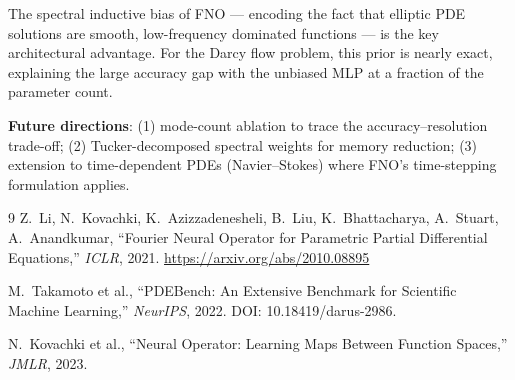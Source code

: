 \documentclass[11pt,a4paper]{article}
\begin{document}
The spectral inductive bias of FNO --- encoding the fact that elliptic PDE solutions are smooth, low-frequency dominated functions --- is the key architectural advantage. For the Darcy flow problem, this prior is nearly exact, explaining the large accuracy gap with the unbiased MLP at a fraction of the parameter count.

\textbf{Future directions}: (1) mode-count ablation to trace the accuracy--resolution trade-off; (2) Tucker-decomposed spectral weights for memory reduction; (3) extension to time-dependent PDEs (Navier--Stokes) where FNO's time-stepping formulation applies.

\begin{thebibliography}{9}
  Z.\ Li, N.\ Kovachki, K.\ Azizzadenesheli, B.\ Liu, K.\ Bhattacharya, A.\ Stuart, A.\ Anandkumar,
  ``Fourier Neural Operator for Parametric Partial Differential Equations,''
  \textit{ICLR}, 2021. \url{https://arxiv.org/abs/2010.08895}

  M.\ Takamoto et al.,
  ``PDEBench: An Extensive Benchmark for Scientific Machine Learning,''
  \textit{NeurIPS}, 2022. DOI: 10.18419/darus-2986.

  N.\ Kovachki et al.,
  ``Neural Operator: Learning Maps Between Function Spaces,''
  \textit{JMLR}, 2023.
\end{thebibliography}
\end{document}
